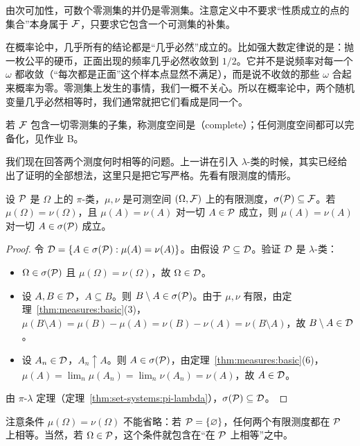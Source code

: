 由次可加性，可数个零测集的并仍是零测集。注意定义中不要求“性质成立的点的集合”本身属于 $\mathcal{F}$，只要求它包含一个可测集的补集。

\begin{remark}
在概率论中，几乎所有的结论都是“几乎必然”成立的。比如强大数定律说的是：抛一枚公平的硬币，正面出现的频率几乎必然收敛到 $1/2$。它并不是说频率对每一个 $\omega$ 都收敛（“每次都是正面”这个样本点显然不满足），而是说不收敛的那些 $\omega$ 合起来概率为零。零测集上发生的事情，我们一概不关心。所以在概率论中，两个随机变量几乎必然相等时，我们通常就把它们看成是同一个。
\end{remark}

若 $\mathcal{F}$ 包含一切零测集的子集，称测度空间是（complete）；任何测度空间都可以完备化，见作业 B。


我们现在回答两个测度何时相等的问题。上一讲在引入 $\lambda$-类的时候，其实已经给出了证明的全部想法，这里只是把它写严格。先看有限测度的情形。

\begin{theorem}[有限测度的唯一性]\label{thm:measures:uniqueness-finite}
设 $\mathcal{P}$ 是 $\Omega$ 上的 $\pi$-类，$\mu,\nu$ 是可测空间 $(\Omega,\mathcal{F})$ 上的有限测度，$\sigma(\mathcal{P})\subseteq\mathcal{F}$。若 $\mu(\Omega)=\nu(\Omega)$，且 $\mu(A)=\nu(A)$ 对一切 $A\in\mathcal{P}$ 成立，则 $\mu(A)=\nu(A)$ 对一切 $A\in\sigma(\mathcal{P})$ 成立。
\end{theorem}
\begin{proof}
令 $\mathcal{D}=\{A\in\sigma(\mathcal{P}):\mu(A)=\nu(A)\}$。由假设 $\mathcal{P}\subseteq\mathcal{D}$。验证 $\mathcal{D}$ 是 $\lambda$-类：
\begin{itemize}
\item $\Omega\in\sigma(\mathcal{P})$ 且 $\mu(\Omega)=\nu(\Omega)$，故 $\Omega\in\mathcal{D}$。
\item 设 $A,B\in\mathcal{D}$，$A\subseteq B$。则 $B\setminus A\in\sigma(\mathcal{P})$。由于 $\mu,\nu$ 有限，由定理~\ref{thm:measures:basic}(3)，$\mu(B\setminus A)=\mu(B)-\mu(A)=\nu(B)-\nu(A)=\nu(B\setminus A)$，故 $B\setminus A\in\mathcal{D}$。
\item 设 $A_n\in\mathcal{D}$，$A_n\uparrow A$。则 $A\in\sigma(\mathcal{P})$，由定理~\ref{thm:measures:basic}(6)，$\mu(A)=\lim_n\mu(A_n)=\lim_n\nu(A_n)=\nu(A)$，故 $A\in\mathcal{D}$。
\end{itemize}
由 $\pi$-$\lambda$ 定理（定理~\ref{thm:set-systems:pi-lambda}），$\sigma(\mathcal{P})\subseteq\mathcal{D}$。
\end{proof}

注意条件 $\mu(\Omega)=\nu(\Omega)$ 不能省略：若 $\mathcal{P}=\{\varnothing\}$，任何两个有限测度都在 $\mathcal{P}$ 上相等。当然，若 $\Omega\in\mathcal{P}$，这个条件就包含在“在 $\mathcal{P}$ 上相等”之中。

